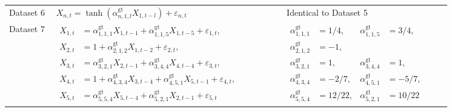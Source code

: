 \begin{landscape}
\begin{longtable}{@{}
>{\raggedright\arraybackslash}p{0.10\linewidth}
>{\raggedright\arraybackslash}p{0.49\linewidth}
>{\raggedright\arraybackslash}p{0.35\linewidth}@{}}
Dataset 6 &
$X_{n,t}=\tanh\!\left(\alpha_{n,1,l}^{\mathrm{gt}}X_{1,t-l}\right)
+\varepsilon_{n,t}$ &
Identical to Dataset 5 \\

Dataset 7 &
$\begin{aligned}
X_{1,t}&=\alpha_{1,1,1}^{\mathrm{gt}}X_{1,t-1}
       +\alpha_{1,1,5}^{\mathrm{gt}}X_{1,t-5}+\varepsilon_{1,t},\\
X_{2,t}&=1+\alpha_{2,1,2}^{\mathrm{gt}}X_{1,t-2}+\varepsilon_{2,t},\\
X_{3,t}&=\alpha_{3,2,1}^{\mathrm{gt}}X_{2,t-1}
       +\alpha_{3,4,4}^{\mathrm{gt}}X_{4,t-4}+\varepsilon_{3,t},\\
X_{4,t}&=1+\alpha_{4,3,4}^{\mathrm{gt}}X_{3,t-4}
       +\alpha_{4,5,1}^{\mathrm{gt}}X_{5,t-1}+\varepsilon_{4,t},\\
X_{5,t}&=\alpha_{5,5,4}^{\mathrm{gt}}X_{5,t-4}
       +\alpha_{5,2,1}^{\mathrm{gt}}X_{2,t-1}+\varepsilon_{5,t}
\end{aligned}$ &
$\begin{aligned}
\alpha_{1,1,1}^{\mathrm{gt}}&=1/4,&
\alpha_{1,1,5}^{\mathrm{gt}}&=3/4,\\
\alpha_{2,1,2}^{\mathrm{gt}}&=-1,\\
\alpha_{3,2,1}^{\mathrm{gt}}&=1,&
\alpha_{3,4,4}^{\mathrm{gt}}&=1,\\
\alpha_{4,3,4}^{\mathrm{gt}}&=-2/7,&
\alpha_{4,5,1}^{\mathrm{gt}}&=-5/7,\\
\alpha_{5,5,4}^{\mathrm{gt}}&=12/22,&
\alpha_{5,2,1}^{\mathrm{gt}}&=10/22
\end{aligned}$ \\


\end{longtable}
\end{landscape}
